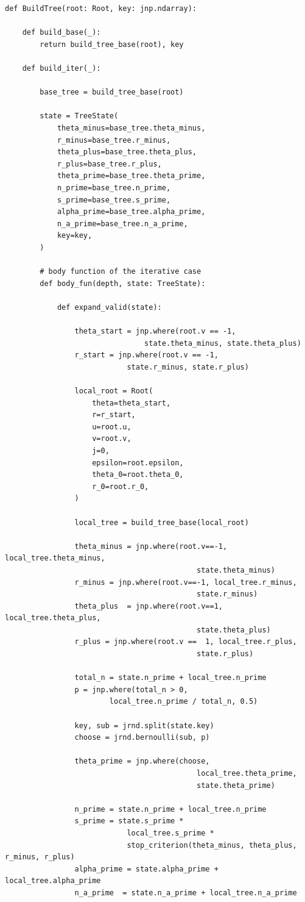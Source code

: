 \documentclass[a4paper,12pt]{article}
\begin{document}
\begin{lstlisting}[xleftmargin=-1.5cm, xrightmargin=-1.5cm, linewidth=1.05\textwidth]
def BuildTree(root: Root, key: jnp.ndarray):

	def build_base(_):
		return build_tree_base(root), key

	def build_iter(_):

		base_tree = build_tree_base(root)

		state = TreeState(
			theta_minus=base_tree.theta_minus,
			r_minus=base_tree.r_minus,
			theta_plus=base_tree.theta_plus,
			r_plus=base_tree.r_plus,
			theta_prime=base_tree.theta_prime,
			n_prime=base_tree.n_prime,
			s_prime=base_tree.s_prime,
			alpha_prime=base_tree.alpha_prime,
			n_a_prime=base_tree.n_a_prime,
			key=key,
		)
		
		# body function of the iterative case
		def body_fun(depth, state: TreeState):

			def expand_valid(state):

				theta_start = jnp.where(root.v == -1, 
								state.theta_minus, state.theta_plus)
				r_start = jnp.where(root.v == -1, 
							state.r_minus, state.r_plus)

				local_root = Root(
					theta=theta_start,
					r=r_start,
					u=root.u,
					v=root.v,
					j=0,
					epsilon=root.epsilon,
					theta_0=root.theta_0,
					r_0=root.r_0,
				)

				local_tree = build_tree_base(local_root)

				theta_minus = jnp.where(root.v==-1, local_tree.theta_minus, 
											state.theta_minus)
				r_minus = jnp.where(root.v==-1, local_tree.r_minus,
											state.r_minus)
				theta_plus  = jnp.where(root.v==1, local_tree.theta_plus,
											state.theta_plus)
				r_plus = jnp.where(root.v ==  1, local_tree.r_plus,
											state.r_plus)

				total_n = state.n_prime + local_tree.n_prime
				p = jnp.where(total_n > 0, 
						local_tree.n_prime / total_n, 0.5)
				
				key, sub = jrnd.split(state.key)
				choose = jrnd.bernoulli(sub, p)
				
				theta_prime = jnp.where(choose, 
											local_tree.theta_prime, 
											state.theta_prime)
				
				n_prime = state.n_prime + local_tree.n_prime
				s_prime = state.s_prime * 
							local_tree.s_prime * 
							stop_criterion(theta_minus, theta_plus, r_minus, r_plus)
				alpha_prime = state.alpha_prime + local_tree.alpha_prime
				n_a_prime  = state.n_a_prime + local_tree.n_a_prime


\end{lstlisting}
\end{document}
